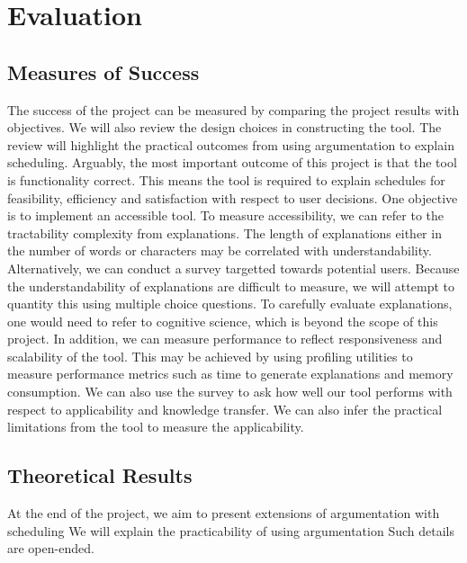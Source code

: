 \chapter{Evaluation}

\section{Measures of Success}

The success of the project can be measured by comparing the project results with objectives. We will also review the design choices in constructing the tool. The review will highlight the practical outcomes from using argumentation to explain scheduling.
\linespace
Arguably, the most important outcome of this project is that the tool is functionality correct. This means the tool is required to explain schedules for feasibility, efficiency and satisfaction with respect to user decisions.
\linespace
One objective is to implement an accessible tool. To measure accessibility, we can refer to the tractability complexity from explanations. The length of explanations either in the number of words or characters may be correlated with understandability. Alternatively, we can conduct a survey targetted towards potential users. Because the understandability of explanations are difficult to measure, we will attempt to quantity this using multiple choice questions. To carefully evaluate explanations, one would need to refer to cognitive science, which is beyond the scope of this project. In addition, we can measure performance to reflect responsiveness and scalability of the tool. This may be achieved by using profiling utilities to measure performance metrics such as time to generate explanations and memory consumption.
\linespace
We can also use the survey to ask how well our tool performs with respect to applicability and knowledge transfer. We can also infer the practical limitations from the tool to measure the applicability.

\section{Theoretical Results}

At the end of the project, we aim to present extensions of argumentation with scheduling We will explain the practicability of using argumentation Such details are open-ended.

